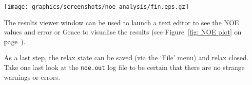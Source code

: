 \begin{minipage}[h]{\linewidth}
\centerline{\texttt{[image: graphics/screenshots/noe\_analysis/fin.eps.gz]}}
\end{minipage}

The results viewer window can be used to launch a text editor to see the NOE values and error or Grace to visualise the results (see Figure~\ref{fig: NOE plot} on page~\pageref{fig: NOE plot}).

As a last step, the relax state can be saved (via the `File' menu) and relax closed.  Take one last look at the \texttt{noe.out} log file to be certain that there are no strange warnings or errors.

